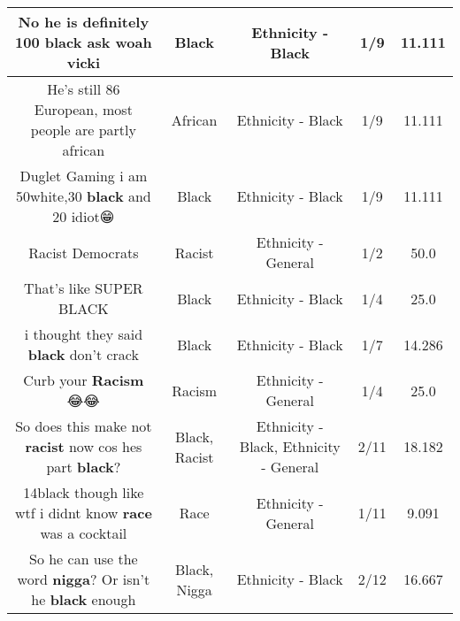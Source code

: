 \documentclass[11pt]{article}
\newlength\mylength
\begin{document}
\begin{center}
\begin{longtable}{|C{.65\mylength}|C{.30\mylength}|C{.12\mylength}|C{.12\mylength}|C{.12\mylength}|}
  \small No he is definitely 100 \textbf{black} ask woah vicki\normalsize   & Black & Ethnicity - Black & 1/9 & 11.111 \\  \hline
  \small He's still 86 European, most people are partly african\normalsize   & African & Ethnicity - Black & 1/9 & 11.111 \\  \hline
  \small Duglet Gaming i am 50white,30 \textbf{black} and 20 idiot😁\normalsize   & Black & Ethnicity - Black & 1/9 & 11.111 \\  \hline
  \small Racist Democrats\normalsize   & Racist & Ethnicity - General & 1/2 & 50.0 \\  \hline
  \small That's like SUPER BLACK\normalsize   & Black & Ethnicity - Black & 1/4 & 25.0 \\  \hline
  \small i thought they said \textbf{black} don't crack\normalsize   & Black & Ethnicity - Black & 1/7 & 14.286 \\  \hline
  \small Curb your \textbf{Racism} 😂😂\normalsize   & Racism & Ethnicity - General & 1/4 & 25.0 \\  \hline
  \small So does this make not \textbf{racist} now cos hes part \textbf{black}?\normalsize   & Black, Racist & Ethnicity - Black, Ethnicity - General & 2/11 & 18.182 \\  \hline
  \small 14black though like wtf i didnt know \textbf{race} was a cocktail\normalsize   & Race & Ethnicity - General & 1/11 & 9.091 \\  \hline
  \small So he can use the word \textbf{nigga}? Or isn't he \textbf{black} enough\normalsize   & Black, Nigga & Ethnicity - Black & 2/12 & 16.667 \\  \hline

\end{longtable}
\end{center}
\end{document}
